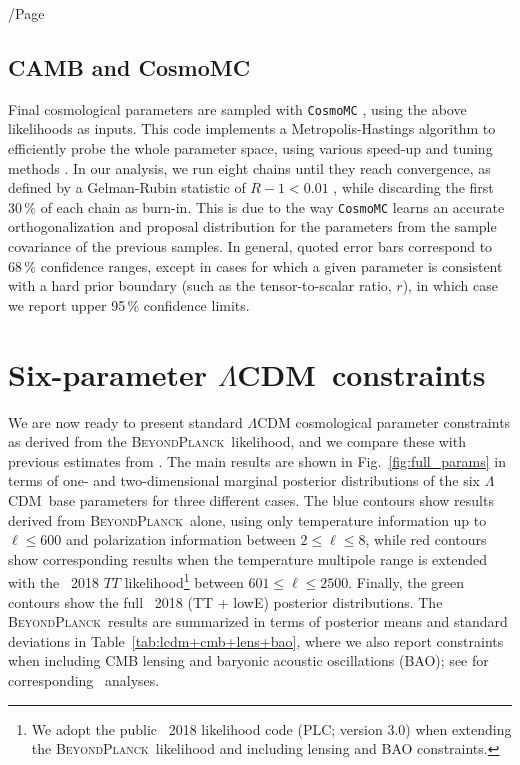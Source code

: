 /Page\documentclass[twocolumn]{aa}
\def\LCDM{$\Lambda$CDM}
\newcommand{\BP}{\textsc{BeyondPlanck}}
\begin{document}
\subsection{CAMB and CosmoMC}
Final cosmological parameters are sampled with \texttt{CosmoMC}
\citep{cosmomc}, using the above likelihoods as inputs. This code
implements a Metropolis-Hastings algorithm to efficiently probe the
whole parameter space, using various speed-up and tuning methods
\citep{neal2005,lewis2013b}. In our analysis, we run eight chains
until they reach convergence, as defined by a Gelman-Rubin statistic
of $R-1<0.01$ \citep{gelman:1992}, while discarding the first 30\,\%
of each chain as burn-in. This is due to the way \texttt{CosmoMC}
learns an accurate orthogonalization and proposal distribution for the
parameters from the sample covariance of the previous samples. In
general, quoted error bars correspond to 68\,\% confidence ranges,
except in cases for which a given parameter is consistent with a hard
prior boundary (such as the tensor-to-scalar ratio, $r$), in which
case we report upper 95\,\% confidence limits. 

\section{Six-parameter \LCDM\ constraints}
\label{sec:LCDM_constraints}

We are now ready to present standard $\Lambda$CDM cosmological
parameter constraints as derived from the \BP\ likelihood, and we
compare these with previous estimates from 
\citep{planck2016-l06}. The main results are shown in
Fig.~\ref{fig:full_params} in terms of one- and two-dimensional
marginal posterior distributions of the six \LCDM\ base parameters for
three different cases. The blue contours show results derived from
\BP\ alone, using only temperature information up to $\ell\le600$ and
polarization information between $2\le\ell\le 8$, while red contours
show corresponding results when the temperature multipole range is
extended with the \Planck\ 2018 $TT$ likelihood\footnote{We adopt the
public \Planck\ 2018 likelihood code (PLC; version 3.0) when
extending the \BP\ likelihood and including lensing and BAO
constraints.} between $601\le\ell\le2500$. Finally, the green contours
show the full \Planck\ 2018 (TT + lowE) posterior distributions. The \BP\ results
are summarized in terms of posterior means and standard deviations in
Table~\ref{tab:lcdm+cmb+lens+bao}, where we also report constraints
when including CMB lensing and baryonic
acoustic oscillations (BAO); see \citep{planck2013-p11,
planck2014-a15} for corresponding \Planck\ analyses. 
\end{document}
